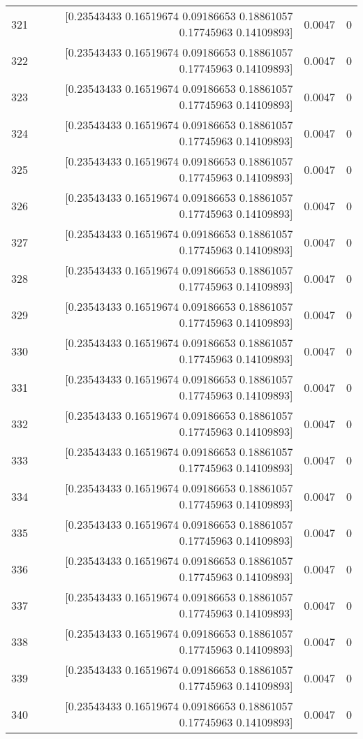 \begin{longtable}{lrrr}
321 & [0.23543433 0.16519674 0.09186653 0.18861057 0.17745963 0.14109893] & 0.0047 & 0 \\
322 & [0.23543433 0.16519674 0.09186653 0.18861057 0.17745963 0.14109893] & 0.0047 & 0 \\
323 & [0.23543433 0.16519674 0.09186653 0.18861057 0.17745963 0.14109893] & 0.0047 & 0 \\
324 & [0.23543433 0.16519674 0.09186653 0.18861057 0.17745963 0.14109893] & 0.0047 & 0 \\
325 & [0.23543433 0.16519674 0.09186653 0.18861057 0.17745963 0.14109893] & 0.0047 & 0 \\
326 & [0.23543433 0.16519674 0.09186653 0.18861057 0.17745963 0.14109893] & 0.0047 & 0 \\
327 & [0.23543433 0.16519674 0.09186653 0.18861057 0.17745963 0.14109893] & 0.0047 & 0 \\
328 & [0.23543433 0.16519674 0.09186653 0.18861057 0.17745963 0.14109893] & 0.0047 & 0 \\
329 & [0.23543433 0.16519674 0.09186653 0.18861057 0.17745963 0.14109893] & 0.0047 & 0 \\
330 & [0.23543433 0.16519674 0.09186653 0.18861057 0.17745963 0.14109893] & 0.0047 & 0 \\
331 & [0.23543433 0.16519674 0.09186653 0.18861057 0.17745963 0.14109893] & 0.0047 & 0 \\
332 & [0.23543433 0.16519674 0.09186653 0.18861057 0.17745963 0.14109893] & 0.0047 & 0 \\
333 & [0.23543433 0.16519674 0.09186653 0.18861057 0.17745963 0.14109893] & 0.0047 & 0 \\
334 & [0.23543433 0.16519674 0.09186653 0.18861057 0.17745963 0.14109893] & 0.0047 & 0 \\
335 & [0.23543433 0.16519674 0.09186653 0.18861057 0.17745963 0.14109893] & 0.0047 & 0 \\
336 & [0.23543433 0.16519674 0.09186653 0.18861057 0.17745963 0.14109893] & 0.0047 & 0 \\
337 & [0.23543433 0.16519674 0.09186653 0.18861057 0.17745963 0.14109893] & 0.0047 & 0 \\
338 & [0.23543433 0.16519674 0.09186653 0.18861057 0.17745963 0.14109893] & 0.0047 & 0 \\
339 & [0.23543433 0.16519674 0.09186653 0.18861057 0.17745963 0.14109893] & 0.0047 & 0 \\
340 & [0.23543433 0.16519674 0.09186653 0.18861057 0.17745963 0.14109893] & 0.0047 & 0 \\

\end{longtable}
